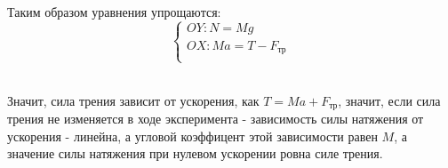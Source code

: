 \documentclass[20pt]{article}
\begin{document}
\\ Таким образом уравнения упрощаются: 
\begin{equation*}
        \left\{ 
        \begin{array}{l}
            OY: N = Mg\\
            OX: Ma = T - F_{тр}\\
        \end{array}
        \right. 
\end{equation*}

 \\ Значит, сила трения зависит от ускорения, как $T = Ma + F_{тр}$, значит, если сила трения не изменяется в ходе эксперимента - зависимость силы натяжения от ускорения - линейна, а угловой коэффицент этой зависимости равен $M$, а значение силы натяжения при нулевом ускорении ровна силе трения.
\end{document}
